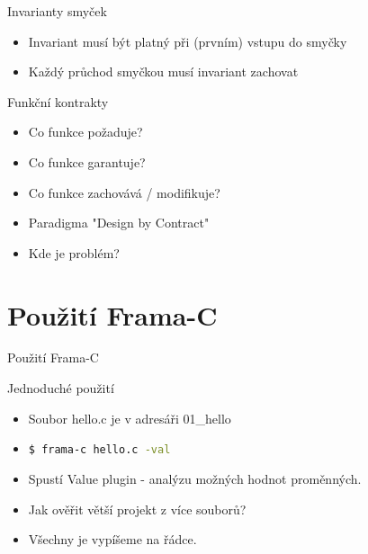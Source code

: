 \documentclass[11pt]{beamer}
\begin{document}

\begin{frame}{Invarianty smyček}
\lstLoopWithInvariant
	\begin{itemize}
		\pause \item Invariant musí být platný při (prvním) vstupu do smyčky
		\pause \item Každý průchod smyčkou musí invariant zachovat
	\end{itemize}
\end{frame}


\begin{frame}{Funkční kontrakty}
\lstFunctionContract
\begin{itemize}
	\pause \item Co funkce požaduje?
	\pause \item Co funkce garantuje?
	\pause \item Co funkce zachovává / modifikuje?
	\pause \item Paradigma "Design by Contract"
	\pause \item Kde je problém?
\end{itemize}
\end{frame}

\section{Použití Frama-C}

\begin{frame}{Použití Frama-C}

\end{frame}

\begin{frame}{Jednoduché použití}
\begin{itemize}
	\item Soubor hello.c je v adresáři 01\_hello
	\item \lstinline[language=bash]{$ frama-c hello.c -val}
	\pause \item Spustí Value plugin - analýzu možných hodnot proměnných.
	\pause \item Jak ověřit větší projekt z více souborů?
	\pause \item Všechny je vypíšeme na řádce.
\end{itemize}
\end{frame}
\end{document}
